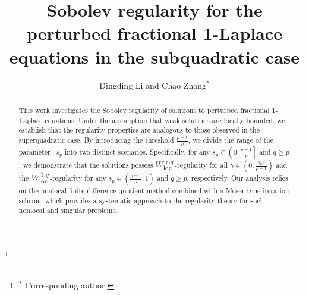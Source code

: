 \documentclass[reqno,10pt]{amsart}
\numberwithin{equation}{section}
\begin{document}
	
	\title[\hfil Sobolev regularity for the perturbed fractional 1-Laplacian] {Sobolev regularity for the perturbed fractional 1-Laplace equations in the subquadratic case}
	
		\author[D. Li and C. Zhang  \hfil \hfilneg]
		{Dingding Li  and Chao Zhang$^*$}
	
	\thanks{$^*$ Corresponding author.}
	
	\address{Dingding Li \hfill\break School of Mathematics, Harbin Institute of Technology, Harbin 150001, China}
	
	
	\address{Chao Zhang  \hfill\break School of Mathematics and Institute for Advanced Study in Mathematics, Harbin Institute of Technology, Harbin 150001, China}
	
	
	
	\maketitle
	
\begin{abstract}
This work investigates the Sobolev regularity of solutions to perturbed fractional 1-Laplace equations.
Under the assumption that weak solutions are locally bounded, we establish that the regularity properties are analogous to those observed in the superquadratic case. By introducing the threshold $\frac{p-1}{p}$, we divide the range of the parameter  $s_p$ into two distinct scenarios. Specifically, for any $s_p\in \left(0, \frac{p-1}{p}\right]$ and $q\ge p$, we demonstrate that the solutions possess $W_{\rm loc}^{\gamma, q}$-regularity for all $\gamma\in \left(0, \frac{s_p p}{p-1}\right)$ and  the $W_{\rm loc}^{1, q}$-regularity for any $s_p\in \left(\frac{p-1}{p}, 1\right)$ and $q\ge p$, respectively.
Our analysis relies on the nonlocal finite-difference quotient method combined with a Moser-type iteration scheme, which provides a systematic approach to the regularity theory for such nonlocal and singular problems.
\end{abstract}
\end{document}
